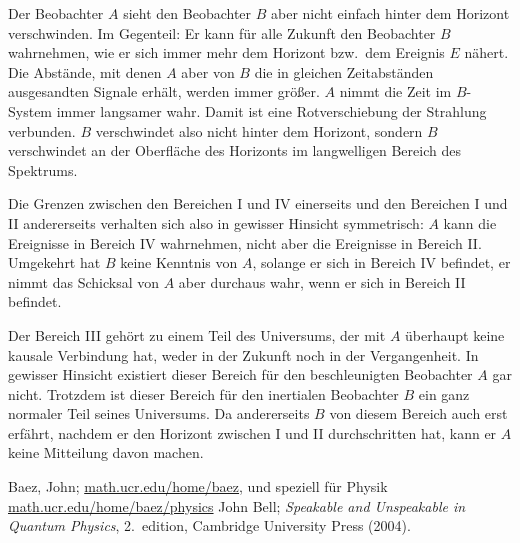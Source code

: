 Der Beobachter $A$ sieht den Beobachter $B$ aber nicht einfach hinter
dem Horizont verschwinden. Im Gegenteil: Er kann f\"ur alle Zukunft den
Beobachter $B$ wahrnehmen, wie er sich immer mehr dem Horizont 
bzw.\ dem Ereignis $E$ n\"ahert.
Die Abst\"ande, mit denen $A$ aber von $B$ die in gleichen 
Zeitabst\"anden ausgesandten 
Signale erh\"alt, werden immer gr\"o\ss er.
$A$ nimmt die Zeit im $B$-System immer langsamer wahr.
Damit ist eine Rotverschiebung der Strahlung
verbunden. $B$ verschwindet
also nicht hinter dem Horizont, sondern $B$ verschwindet an der 
Oberfl\"ache des Horizonts im langwelligen Bereich des Spektrums. 

Die Grenzen zwischen den Bereichen I und IV einerseits und den
Bereichen I und II andererseits verhalten sich also in gewisser
Hinsicht symmetrisch: $A$ kann die Ereignisse in Bereich IV wahrnehmen,
nicht aber die Ereignisse in Bereich II. Umgekehrt hat $B$ keine
Kenntnis von $A$, solange er sich in Bereich IV befindet, er nimmt
das Schicksal von $A$ aber durchaus wahr, wenn er sich in Bereich II
befindet.

Der Bereich III geh\"ort zu einem Teil des Universums, der mit $A$
\"uberhaupt keine kausale Verbindung hat, weder in der Zukunft noch
in der Vergangenheit. In gewisser Hinsicht existiert dieser Bereich f\"ur
den beschleunigten Beobachter $A$ gar nicht. Trotzdem ist dieser Bereich 
f\"ur den inertialen Beobachter $B$ ein ganz normaler Teil seines
Universums. Da andererseits $B$ von diesem Bereich auch erst erf\"ahrt,
nachdem er den Horizont zwischen I und II durchschritten hat, kann er 
$A$ keine Mitteilung davon machen.

\begin{thebibliography}{99}
 Baez, John; \url{math.ucr.edu/home/baez}, und speziell f\"ur Physik 
                 \url{math.ucr.edu/home/baez/physics}
 John Bell;  {\em Speakable and Unspeakable in 
        Quantum Physics}, 2.\ edition, Cambridge University Press (2004).       
\end{thebibliography}

%
